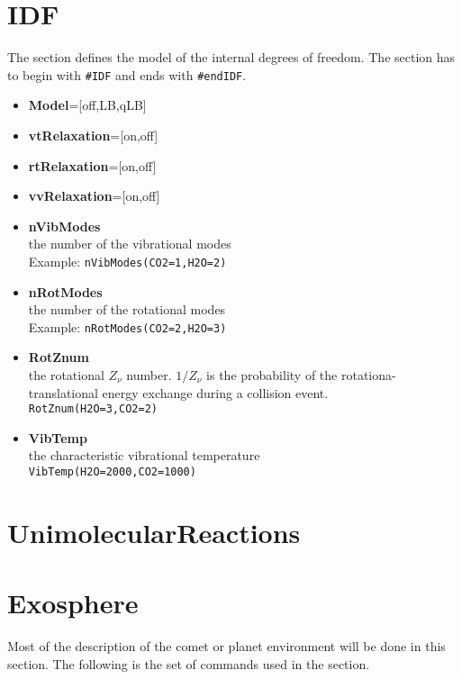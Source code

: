 \section{IDF}
The section defines the model of the internal degrees of freedom. The section has to begin with {\tt \#IDF} and ends with {\tt \#endIDF}. 

\begin{itemize}
\item {\bf Model}=[off,LB,qLB]
\item {\bf vtRelaxation}=[on,off]
\item {\bf rtRelaxation}=[on,off]
\item {\bf vvRelaxation}=[on,off]
\item {\bf nVibModes} \\ the number of the vibrational modes \\ Example: {\tt nVibModes(CO2=1,H2O=2)} 
\item {\bf nRotModes} \\ the number of the rotational modes \\ Example: {\tt nRotModes(CO2=2,H2O=3)}
\item {\bf RotZnum} \\ the rotational $Z_\nu$ number. $1/Z_\nu$ is the probability of the rotationa-translational energy exchange during a collision event. \\ {\tt RotZnum(H2O=3,CO2=2)}
\item {\bf VibTemp} \\ the characteristic vibrational temperature \\ {\tt  VibTemp(H2O=2000,CO2=1000)}

\end{itemize}




\section{UnimolecularReactions}


\section{Exosphere}

Most of the description of the comet or planet environment will be done in this section. The following is the set of commands used in the section.

